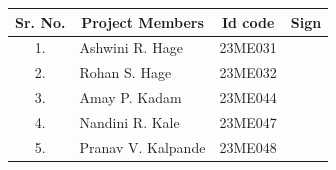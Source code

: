 \vspace{6mm}
\begin{center}
\renewcommand{\arraystretch}{1.5}
\begin{tabular}{|c|l|c|p{40mm}|}
\hline
\rowcolor{gray!20}
\textbf{Sr. No.} & \multicolumn{1}{c|}{\textbf{Project Members}} & \textbf{Id code} & \multicolumn{1}{c|}{\textbf{Sign}} \\
\hline
1. & Ashwini R. Hage & 23ME031 & \\
\hline
2. & Rohan S. Hage & 23ME032 & \\
\hline
3. & Amay P. Kadam & 23ME044 & \\
\hline
4. & Nandini R. Kale & 23ME047 & \\
\hline
5. & Pranav V. Kalpande & 23ME048 & \\
\hline
\end{tabular}
\end{center}
\clearpage
